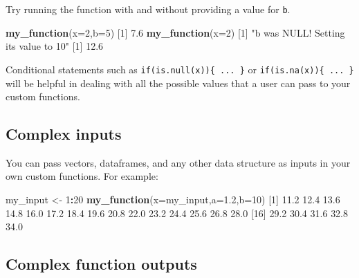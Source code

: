 \documentclass[
]{book}
\newenvironment{Shaded}{\begin{snugshade}}{\end{snugshade}}
\newcommand{\DataTypeTok}[1]{\textcolor[rgb]{0.13,0.29,0.53}{#1}}
\newcommand{\DecValTok}[1]{\textcolor[rgb]{0.00,0.00,0.81}{#1}}
\newcommand{\FloatTok}[1]{\textcolor[rgb]{0.00,0.00,0.81}{#1}}
\newcommand{\KeywordTok}[1]{\textcolor[rgb]{0.13,0.29,0.53}{\textbf{#1}}}
\newcommand{\NormalTok}[1]{#1}
\newcommand{\OperatorTok}[1]{\textcolor[rgb]{0.81,0.36,0.00}{\textbf{#1}}}
\newcommand{\StringTok}[1]{\textcolor[rgb]{0.31,0.60,0.02}{#1}}
\begin{document}
Try running the function with and without providing a value for \texttt{b}.

\begin{Shaded}
\begin{Highlighting}[]
\KeywordTok{my_function}\NormalTok{(}\DataTypeTok{x=}\DecValTok{2}\NormalTok{,}\DataTypeTok{b=}\DecValTok{5}\NormalTok{)}
\NormalTok{[}\DecValTok{1}\NormalTok{] }\FloatTok{7.6}
\KeywordTok{my_function}\NormalTok{(}\DataTypeTok{x=}\DecValTok{2}\NormalTok{)}
\NormalTok{[}\DecValTok{1}\NormalTok{] }\StringTok{"b was NULL! Setting its value to  10"}
\NormalTok{[}\DecValTok{1}\NormalTok{] }\FloatTok{12.6}
\end{Highlighting}
\end{Shaded}

Conditional statements such as \texttt{if(is.null(x))\{\ ...\ \}} or \texttt{if(is.na(x))\{\ ...\ \}} will be helpful in dealing with all the possible values that a user can pass to your custom functions.

\hypertarget{complex-inputs}{%
\subsection*{Complex inputs}\label{complex-inputs}}

You can pass vectors, dataframes, and any other data structure as inputs in your own custom functions. For example:

\begin{Shaded}
\begin{Highlighting}[]
\NormalTok{my_input <-}\StringTok{ }\DecValTok{1}\OperatorTok{:}\DecValTok{20}
\KeywordTok{my_function}\NormalTok{(}\DataTypeTok{x=}\NormalTok{my_input,}\DataTypeTok{a=}\FloatTok{1.2}\NormalTok{,}\DataTypeTok{b=}\DecValTok{10}\NormalTok{)}
\NormalTok{ [}\DecValTok{1}\NormalTok{] }\FloatTok{11.2} \FloatTok{12.4} \FloatTok{13.6} \FloatTok{14.8} \FloatTok{16.0} \FloatTok{17.2} \FloatTok{18.4} \FloatTok{19.6} \FloatTok{20.8} \FloatTok{22.0} \FloatTok{23.2} \FloatTok{24.4} \FloatTok{25.6} \FloatTok{26.8} \FloatTok{28.0}
\NormalTok{[}\DecValTok{16}\NormalTok{] }\FloatTok{29.2} \FloatTok{30.4} \FloatTok{31.6} \FloatTok{32.8} \FloatTok{34.0}
\end{Highlighting}
\end{Shaded}

\hypertarget{complex-function-outputs}{%
\subsection*{Complex function outputs}\label{complex-function-outputs}}
\end{document}
